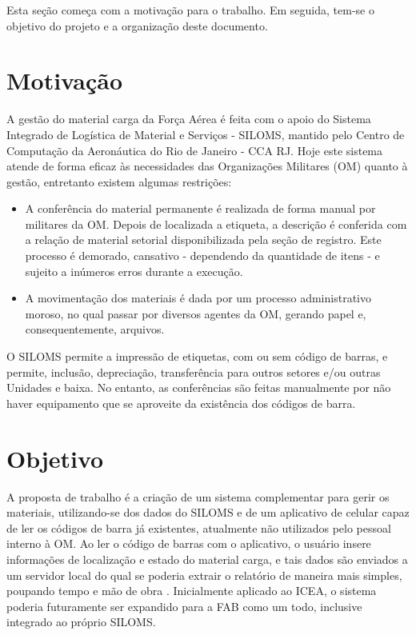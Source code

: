 Esta seção começa com a motivação para o trabalho. Em seguida, tem-se o objetivo do projeto e a organização deste documento.

\section{Motivação}

A gestão do material carga da Força Aérea é feita com o apoio do Sistema
Integrado de Logística de Material e Serviços - SILOMS, mantido pelo Centro de
Computação da Aeronáutica do Rio de Janeiro - CCA RJ. Hoje este sistema atende de
forma eficaz às necessidades das Organizações Militares (OM) quanto à gestão, entretanto
existem algumas restrições:

\begin{itemize}

	\item A conferência do material permanente é realizada de forma
manual por militares da OM. Depois de localizada a etiqueta, a
descrição é conferida com a relação de material setorial disponibilizada pela
seção de registro. Este processo é demorado, cansativo - dependendo da
quantidade de itens - e sujeito a inúmeros erros durante a execução.

	\item A movimentação dos materiais é dada por um processo
administrativo moroso, no qual passar por diversos agentes da OM, gerando
papel e, consequentemente, arquivos.

\end{itemize}

O SILOMS permite a impressão de etiquetas, com ou sem código de barras, e
permite, inclusão, depreciação, transferência para outros setores e/ou outras Unidades e
baixa. No entanto, as conferências são feitas manualmente por não haver equipamento que se
aproveite da existência dos códigos de barra.

\section{Objetivo}
A proposta de trabalho é a criação de um sistema complementar para gerir os materiais, utilizando-se dos dados do SILOMS e de um aplicativo de celular capaz de ler os códigos de barra já existentes, atualmente não utilizados pelo pessoal interno à OM. Ao ler o código de barras com o aplicativo, o usuário insere informações de localização e estado do material carga, e tais dados são enviados a um servidor local do qual se poderia extrair o relatório de maneira mais simples, poupando tempo e mão de obra . Inicialmente aplicado ao ICEA, o sistema poderia futuramente ser expandido para a FAB como um todo, inclusive integrado ao próprio SILOMS.

